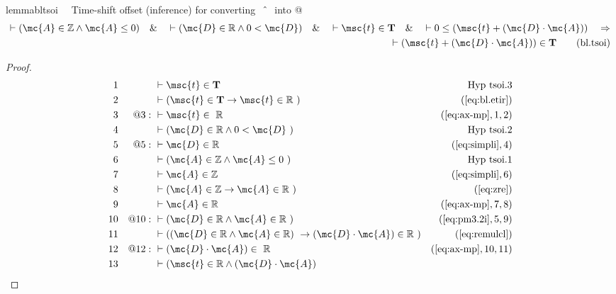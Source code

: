 \begin{restatable}{lemma}{bltsoi}~~ Time-shift offset (inference) for
converting $~\string^~$ into @
\begin{align}
\vdash ( \mc{A} \in \mathbb{Z} \wedge \mc{A} \le 0 )\quad\&\quad \vdash (
    \mc{D} \in \mathbb{R} \wedge 0 < \mc{D} )\quad\&\quad \vdash \msc{t} \in
    \mathbf{T}\quad\&\quad \vdash 0 \le ( \msc{t} + ( \mc{D} \cdot \mc{A} )
    )\quad\Rightarrow \notag \\ 
	\quad \vdash ( \msc{t} + ( \mc{D} \cdot \mc{A} ) ) \in
    \mathbf{T}\label{eq:bl.tsoi}\tag{bl.tsoi}
\end{align}
\end{restatable}

\begin{proof}
\begin{align}
  1 &&  & \vdash \msc{t} \in \mathbf{T}&\text{Hyp~tsoi.3}\notag%
  \\ 2 &&  & \vdash ( \msc{t} \in \mathbf{T} \rightarrow \msc{t} \in \mathbb{R}
     ~)&(\mbox{\ref{eq:bl.etir}})\notag
  \\ 3 && @3:\  & \vdash \msc{t} \in
     ~\mathbb{R}&(\mbox{\ref{eq:ax-mp}},1,2)\notag
  \\ 4 &&  & \vdash ( \mc{D} \in \mathbb{R} \wedge 0 < \mc{D}
     ~)&\text{Hyp~tsoi.2}\notag%
  \\ 5 && @5:\  & \vdash \mc{D} \in \mathbb{R}&(\mbox{\ref{eq:simpli}},4)\notag
  \\ 6 &&  & \vdash ( \mc{A} \in \mathbb{Z} \wedge \mc{A} \le 0
     ~)&\text{Hyp~tsoi.1}\notag%
  \\ 7 &&  & \vdash \mc{A} \in \mathbb{Z}&(\mbox{\ref{eq:simpli}},6)\notag
  \\ 8 &&  & \vdash ( \mc{A} \in \mathbb{Z} \rightarrow \mc{A} \in \mathbb{R}
     ~)&(\mbox{\ref{eq:zre}})\notag
  \\ 9 &&  & \vdash \mc{A} \in \mathbb{R}&(\mbox{\ref{eq:ax-mp}},7,8)\notag
  \\ 10 && @10:\  & \vdash ( \mc{D} \in \mathbb{R} \wedge \mc{A} \in \mathbb{R}
     ~)&(\mbox{\ref{eq:pm3.2i}},5,9)\notag
  \\ 11 &&  & \vdash ( ( \mc{D} \in \mathbb{R} \wedge \mc{A} \in \mathbb{R} )
     ~\rightarrow ( \mc{D} \cdot \mc{A} ) \in \mathbb{R}
     ~)&(\mbox{\ref{eq:remulcl}})\notag
  \\ 12 && @12:\  & \vdash ( \mc{D} \cdot \mc{A} ) \in
     ~\mathbb{R}&(\mbox{\ref{eq:ax-mp}},10,11)\notag
  \\ 13 &&  & \vdash ( \msc{t} \in \mathbb{R} \wedge ( \mc{D} \cdot \mc{A} )

\end{align}
\end{proof}
